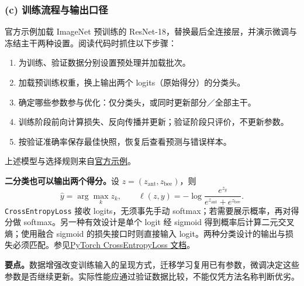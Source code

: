 \subsubsection*{(c) 训练流程与输出口径}
官方示例加载 ImageNet 预训练的 ResNet-18，替换最后全连接层，并演示微调与冻结主干两种设置。阅读代码时抓住以下步骤：
\begin{enumerate}
\item 为训练、验证数据分别设置预处理并加载批次。
\item 加载预训练权重，换上输出两个 logits（原始得分）的分类头。
\item 确定哪些参数参与优化：仅分类头，或同时更新部分／全部主干。
\item 训练阶段前向计算损失、反向传播并更新；验证阶段只评价，不更新参数。
\item 按验证准确率保存最佳快照，恢复后查看预测与错误样本。
\end{enumerate}
上述模型与选择规则来自\href{https://docs.pytorch.org/tutorials/beginner/transfer_learning_tutorial.html}{官方示例}。

\textbf{二分类也可以输出两个得分。}设 $z=(z_{\mathrm{ant}},z_{\mathrm{bee}})$，则
\[
\widehat y=\arg\max_k z_k,\qquad
\ell(z,y)=-\log\frac{e^{z_y}}{e^{z_{\mathrm{ant}}}+e^{z_{\mathrm{bee}}}}.
\]
\texttt{CrossEntropyLoss} 接收 logits，无须事先手动 softmax；若需要展示概率，再对得分做 softmax。另一种有效设计是单个 logit 经 sigmoid 得到概率后计算二元交叉熵；使用融合 sigmoid 的损失接口时则直接输入 logit。两种分类设计的输出与损失必须匹配。参见\href{https://docs.pytorch.org/docs/2.14/generated/torch.nn.CrossEntropyLoss.html}{PyTorch CrossEntropyLoss 文档}。

\textbf{要点。}数据增强改变训练输入的呈现方式，迁移学习复用已有参数，微调决定这些参数是否继续更新。实际性能应通过验证数据比较，不能仅凭方法名称判断优劣。
